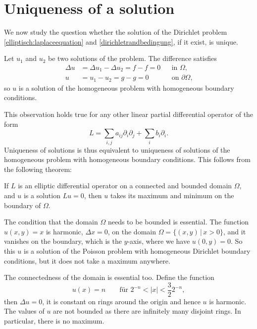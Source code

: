 %
%
%
\section{Uniqueness of a solution}
We now study the question whether the solution of the Dirichlet problem
\eqref{elliptisch:laplaceequation} and \eqref{dirichletrandbedingung},
if it exist, is unique.

Let $u_1$ and $u_2$ be two solutions of the problem.
The difference satisfies
\[
\begin{aligned}
\Delta u&=\Delta u_1-\Delta u_2=f-f=0&&\text{in $\Omega$,}\\
u&=u_1-u_2=g-g=0&&\text{on $\partial\Omega$,}
\end{aligned}
\]
so $u$ is a solution of the homogeneous problem with homogeneous 
boundary conditions.

This observation holds true for any other linear partial differential
operator of the form
\[
L=\sum_{i,j}a_{ij}\partial_i\partial_j+\sum_i b_i\partial_i.
\]
Uniqueness of solutions is thus equivalent to uniqueness of solutions
of the homogeneous problem with homogeneous boundary conditions.
This follows from the following theorem:

\begin{satz}
\label{maximumprinzip}
If $L$ is an elliptic differential operator on a connected and
bounded domain $\Omega$, and $u$ is a solution $Lu=0$, then $u$ takes
its maximum and minimum on the boundary of $\Omega$.
\end{satz}

The condition that the domain $\Omega$ needs to be bounded is essential.
The function $u(x,y)=x$ is harmonic, $\Delta x=0$, on the domain
$\Omega=\{(x,y)\,|\,x>0\}$, and it vanishes on the boundary, which is
the $y$-axis, where we have $u(0,y)=0$.
So this $u$ is a solution of the Poisson problem with homogeneous
Dirichlet boundary conditions,
but it does not take a maximum anywhere.

The connectedness of the domain is essential too.
Define the function
\[
u(x)=n\qquad\text{für $2^{-n} < |x| < \frac{3}{2}2^{-n}$},
\]
then $\Delta u=0$, it is constant on rings around the origin and hence
$u$ is harmonic.
The values of $u$ are not bounded as there are infinitely many disjoint
rings.
In particular, there is no maximum.

